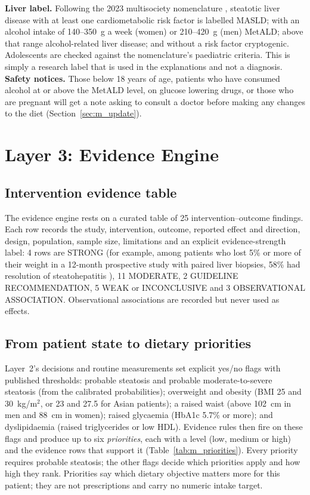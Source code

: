 \textbf{Liver label.} Following the 2023 multisociety nomenclature
\cite{rinella2023nomenclature}, steatotic liver disease with at least one
cardiometabolic risk factor is labelled MASLD; with an alcohol intake of
140--350~g a week (women) or 210--420~g (men) MetALD; above that range
alcohol-related liver disease; and without a risk factor cryptogenic.
Adolescents are checked against the nomenclature's paediatric criteria. This is simply a 
research label that is used in the explanations and not a diagnosis. 
\textbf{Safety notices.} Those below 18 years of age, patients who have consumed alcohol at or above the MetALD
 level, on glucose lowering drugs, or those who are pregnant will get a note asking to 
consult a doctor before making any changes to the diet (Section~\ref{sec:m_update}).

\section{Layer 3: Evidence Engine}
\label{sec:m_layer3}

\subsection{Intervention evidence table}

The evidence engine rests on a curated table of 25 intervention--outcome
findings. Each row records the study, intervention, outcome, reported effect
and direction, design, population, sample size, limitations and an explicit
evidence-strength label: 4 rows are STRONG (for example, among patients who
lost 5\% or more of their weight in a 12-month prospective study with paired
liver biopsies, 58\% had resolution of steatohepatitis
\cite{vilargomez2015weight}), 11 MODERATE, 2 GUIDELINE RECOMMENDATION, 5 WEAK
or INCONCLUSIVE and 3 OBSERVATIONAL ASSOCIATION. Observational associations
are recorded but never used as effects.

\subsection{From patient state to dietary priorities}

Layer~2's decisions and routine measurements set explicit yes/no flags with
published thresholds: probable steatosis and probable moderate-to-severe
steatosis (from the calibrated probabilities); overweight and obesity (BMI 25
and 30~kg/m$^2$, or 23 and 27.5 for Asian patients); a raised waist (above
102~cm in men and 88~cm in women); raised glycaemia (HbA1c 5.7\% or more); and
dyslipidaemia (raised triglycerides or low HDL). Evidence rules then fire on
these flags and produce up to six \emph{priorities}, each with a level (low,
medium or high) and the evidence rows that support it
(Table~\ref{tab:m_priorities}). Every priority requires probable steatosis;
the other flags decide which priorities apply and how high they rank.
Priorities say which dietary objective matters
more for this patient; they are not prescriptions and carry no numeric
intake target.

